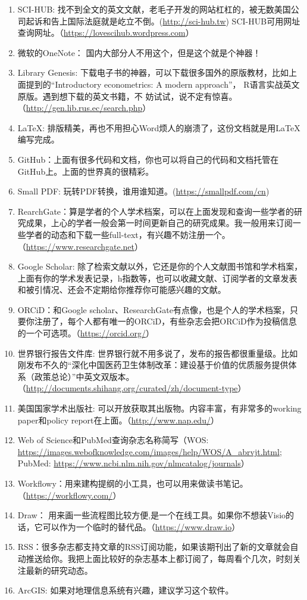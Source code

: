 \documentclass[11pt, a4paper]{article}
\begin{document}
\begin{enumerate}[(1)]
	\item SCI-HUB: 找不到全文的英文文献，老毛子开发的网站杠杠的，被无数美国公司起诉和告上国际法庭就是屹立不倒。(\url{http://sci-hub.tw}) SCI-HUB可用网址查询网址。（\url{https://lovescihub.wordpress.com}）
	\item 微软的OneNote： 国内大部分人不用这个，但是这个就是个神器！
	\item Library Genesis: 下载电子书的神器，可以下载很多国外的原版教材，比如上面提到的“Introductory econometrics: A modern approach”， R语言实战英文原版。遇到想下载的英文书籍，不 妨试试，说不定有惊喜。（\url{http://gen.lib.rus.ec/search.php}）
	\item \LaTeX: 排版精美，再也不用担心Word烦人的崩溃了，这份文档就是用\LaTeX 编写完成。
	\item GitHub：上面有很多代码和文档，你也可以将自己的代码和文档托管在GitHub上。上面的世界真的很精彩。
	\item Small PDF: 玩转PDF转换，谁用谁知道。(\url{https://smallpdf.com/cn}) 
	\item RearchGate：算是学者的个人学术档案，可以在上面发现和查询一些学者的研究成果，上心的学者一般会第一时间更新自己的研究成果。我一般用来订阅一些学者的动态和下载一些full-text，有兴趣不妨注册一个。（\url{https://www.researchgate.net}）
	\item Google Scholar: 除了检索文献以外，它还是你的个人文献图书馆和学术档案，上面有你的学术发表记录，h指数等，也可以收藏文献、订阅学者的文章发表和被引情况、还会不定期给你推荐你可能感兴趣的文献。
	\item ORCiD：和Google scholar、ResearchGate有点像，也是个人的学术档案，只要你注册了，每个人都有唯一的ORCiD，有些杂志会把ORCiD作为投稿信息的一个可选项。（\url{https://orcid.org/}）
	\item 世界银行报告文件库: 世界银行就不用多说了，发布的报告都很重量级。比如刚发布不久的“深化中国医药卫生体制改革：建设基于价值的优质服务提供体系（政策总论）”中英文双版本。（\url{http://documents.shihang.org/curated/zh/document-type}）
	\item 美国国家学术出版社: 可以开放获取其出版物。内容丰富，有非常多的working paper和policy report在上面。（\url{http://www.nap.edu/}）
	\item Web of Science和PubMed查询杂志名称简写（WOS: \url{https://images.webofknowledge.com/images/help/WOS/A_abrvjt.html}; PubMed: \url{https://www.ncbi.nlm.nih.gov/nlmcatalog/journals}）
	\item Workflowy：用来建构提纲的小工具，也可以用来做读书笔记。（\url{https://workflowy.com/}） 
	\item Draw： 用来画一些流程图比较方便,是一个在线工具。如果你不想装Visio的话，它可以作为一个临时的替代品。（\url{https://www.draw.io}）
	\item RSS：很多杂志都支持文章的RSS订阅功能，如果该期刊出了新的文章就会自动推送给你。我把上面比较好的杂志基本上都订阅了，每周看个几次，时刻关注最新的研究动态。
	\item ArcGIS: 如果对地理信息系统有兴趣，建议学习这个软件。
\end{enumerate}
\end{document}
